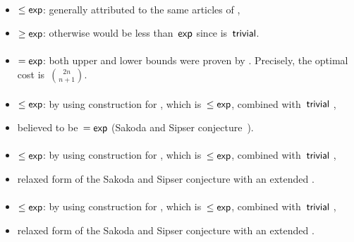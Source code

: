 \paragraph{\TNFA{}\tto\ODFA}\label{cost:2NFAto1DFA}
\begin{itemize}
	\item $\le\mathsf{exp}$: generally attributed to the same articles of \hyperref[cost:2DFAto1DFA]{\TDFA{}\tto\ODFA},
	\item $\ge\mathsf{exp}$: otherwise \hyperref[cost:1NFAto1DFA]{\ONFA{}\tto\ODFA} would be less than~$\mathsf{exp}$ since \ONFA{}\tto\TNFA is~$\mathsf{trivial}$.
\end{itemize}
\paragraph{\TNFA{}\tto\ONFA}
\begin{itemize}
	\item $=\mathsf{exp}$: both upper and lower bounds were proven by . Precisely, the optimal cost is~$\binom{2n}{n+1}$.
\end{itemize}
\paragraph{\TNFA{}\tto\TDFA}
\begin{itemize}
	\item $\le\mathsf{exp}$: by using construction for \hyperref[cost:2NFAto1DFA]{\TNFA{}\tto\ODFA}, which is~$\le\mathsf{exp}$, combined with~$\mathsf{trivial}$ \ODFA{}\tto\TDFA,
	\item believed to be~$=\mathsf{exp}$ (Sakoda and Sipser conjecture~\cite{SakSip78}).
\end{itemize}
\paragraph{\ONFA{}\tto\ODLA}
\begin{itemize}
	\item $\le\mathsf{exp}$: by using construction for \hyperref[cost:1NFAto1DFA]{\ONFA{}\tto\ODFA}, which is~$\le\mathsf{exp}$, combined with~$\mathsf{trivial}$ \ODFA{}\tto\ODLA,
	\item relaxed form of the Sakoda and Sipser conjecture with an extended \TDFA.
\end{itemize}
\paragraph{\TNFA{}\tto\ODLA}
\begin{itemize}
	\item $\le\mathsf{exp}$: by using construction for \hyperref[cost:2NFAto1DFA]{\TNFA{}\tto\ODFA}, which is~$\le\mathsf{exp}$, combined with~$\mathsf{trivial}$ \ODFA{}\tto\ODLA,
	\item relaxed form of the Sakoda and Sipser conjecture with an extended \TDFA.
\end{itemize}

